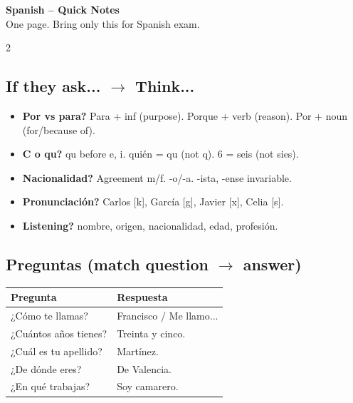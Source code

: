 \documentclass[10pt,landscape,a4paper]{article}
\begin{document}
\normalsize

\begin{center}
{\LARGE\bfseries\color{accent} Spanish -- Quick Notes}\\[0.3em]
\small One page. Bring only this for Spanish exam.
\end{center}
\vspace{0.5em}

\begin{multicols}{2}

\subsection*{\color{accent} If they ask... $\to$ Think...}
\begin{itemize}[leftmargin=*,nosep]
\item \textbf{Por vs para?} Para + inf (purpose). Porque + verb (reason). Por + noun (for/because of).
\item \textbf{C o qu?} qu before e, i. qui\'en = qu (not q). 6 = seis (not sies).
\item \textbf{Nacionalidad?} Agreement m/f. -o/-a. -ista, -ense invariable.
\item \textbf{Pronunciaci\'on?} Carlos [k], Garc\'ia [g], Javier [x], Celia [s].
\item \textbf{Listening?} nombre, origen, nacionalidad, edad, profesi\'on.
\end{itemize}

\subsection*{\color{accent} Preguntas (match question $\to$ answer)}
\begin{center}
\small
\begin{tabular}{@{}ll@{}}
\toprule
\textbf{Pregunta} & \textbf{Respuesta} \\
\midrule
¿C\'omo te llamas? & Francisco / Me llamo... \\
¿Cu\'antos a\~nos tienes? & Treinta y cinco. \\
¿Cu\'al es tu apellido? & Mart\'inez. \\
¿De d\'onde eres? & De Valencia. \\
¿En qu\'e trabajas? & Soy camarero. \\
\bottomrule
\end{tabular}
\end{center}


\end{multicols}
\end{document}
